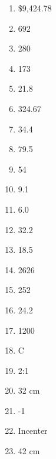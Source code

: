 \documentclass[../uilmath.tex]{subfiles}
\begin{document}
\begin{enumerate}[label=\bfseries\arabic*.]
    \item %
    \$9,424.78

    \item %
    692

    \item %
    280

    \item %
    173

    \item %
    21.8

    \item %
    324.67

    \item %
    34.4

    \item %
    79.5 

    \item %
    54

    \item %
    9.1

    \item %
    6.0

    \item %
    32.2

    \item %
    18.5

    \item %
    2626

    \item %
    252

    \item %
    24.2

    \item %
    1200

    \item %
    C 

    \item %
    2:1 

    \item %
    32 cm

    \item %
    -1

    \item %
    Incenter 

    \item %
    42 cm 


\end{enumerate}
\end{document}
